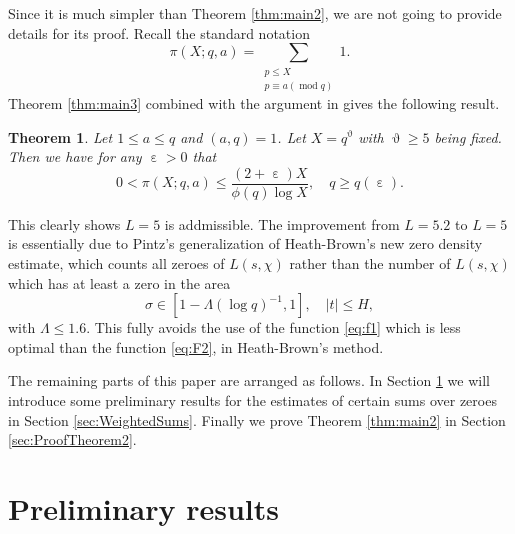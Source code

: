 \documentclass[10pt, reqno]{amsart}
\numberwithin{equation}{section}
\newtheorem{theorem}{Theorem}[section]
\renewcommand{\mod }{\operatorname{mod}}
\renewcommand{\epsilon }{\operatorname{\varepsilon}}
\renewcommand{\theta }{\operatorname{\vartheta}}
\def\beq{\begin{equation}}
\def\eeq{\end{equation}}
\begin{document}
 Since it is much simpler than Theorem \ref{thm:main2}, we are not going to provide details for its proof. Recall the standard notation
\beq
\pi(X;q,a)=\sum_{\substack{p\leq X\\p\equiv a(\mod q)}} 1.
\eeq 
 Theorem \ref{thm:main3} combined with the argument in  \cite{Maynard} gives the following result.

\begin{theorem}\label{thm:main4}
Let $1\leq a\leq q$ and $(a,q)=1$. Let $X=q^{\theta}$ with $\theta\geq 5$ being fixed. Then we have for any $\epsilon>0$ that
\begin{equation}\label{eq:Bound1}
0<\pi(X;q,a)\leq \frac{(2+\epsilon)X}{\phi(q)\log X}, \quad q\geq q(\epsilon).
\end{equation}
\end{theorem}

This clearly shows $L=5$ is addmissible. The improvement from $L=5.2$ to $L=5$ is essentially due to Pintz's generalization of Heath-Brown's new zero density estimate, which counts all zeroes of $L(s,\chi )$ rather than the number of $L(s,\chi )$ which has at least a zero in the area
\begin{equation}\label{eq:Area}
\sigma \in [1-\Lambda(\log q)^{-1},1],\quad |t| \leq H,
\end{equation}
with $\Lambda\leq 1.6$. This fully avoids the use of the function \eqref{eq:f1} which is less optimal than the function \eqref{eq:F2}, in Heath-Brown's  method.

The remaining parts of this paper are arranged as follows. In Section \ref{sec:Preliminary} we will introduce some preliminary results for the estimates of certain sums over zeroes in Section \ref{sec:WeightedSums}. Finally   we  prove Theorem \ref{thm:main2} in Section \ref{sec:ProofTheorem2}. 

\section{Preliminary results}\label{sec:Preliminary}
\end{document}
